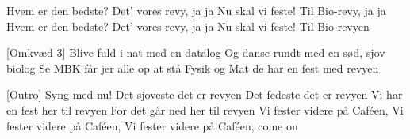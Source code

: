 \documentclass[a4paper,11pt]{article}
\begin{document}
\begin{song}
    Hvem er den bedste?
Det’ vores revy, ja ja
Nu skal vi feste!
Til Bio-revy, ja ja
Hvem er den bedste?
Det’ vores revy, ja ja
Nu skal vi feste!
Til Bio-revyen
 
  [Omkvæd 3] Blive fuld i nat med en datalog
Og danse rundt med en sød, sjov biolog
Se MBK får jer alle op at stå
Fysik og Mat de har en fest med revyen
 
   [Outro] Syng med nu!
Det sjoveste det er revyen
Det fedeste det er revyen
Vi har en fest her til revyen
For det går ned her til revyen
Vi fester videre på Caféen,
Vi fester videre på Caféen,  
Vi fester videre på Caféen, come on

\end{song}
\end{document}

